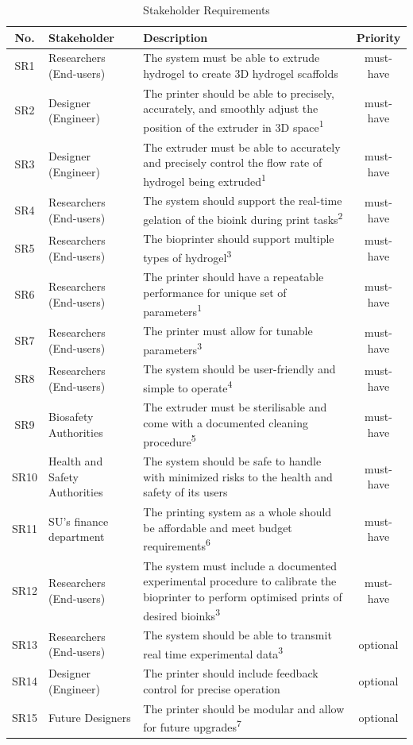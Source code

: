 \begin{longtable}{|c|m{2.2cm}|m{7.3cm}|c|}
\caption{Stakeholder Requirements}
\label{tab:stakeholder_requirements} \\
\hline
\textbf{No.} & \textbf{Stakeholder} & \textbf{Description} & \textbf{Priority} \\
\hline
\endhead
\hline
SR1 & Researchers (End-users) & The system must be able to extrude hydrogel to create 3D hydrogel scaffolds & must-have \\
\hline
SR2 & Designer (Engineer) & The printer should be able to precisely, accurately, and smoothly adjust the position of the extruder in 3D space\textsuperscript{1} & must-have \\
\hline
SR3 & Designer (Engineer) & The extruder must be able to accurately and precisely control the flow rate of hydrogel being extruded\textsuperscript{1} & must-have \\
\hline
SR4 & Researchers (End-users) & The system should support the real-time gelation of the bioink during print tasks\textsuperscript{2} & must-have \\
\hline
SR5 & Researchers (End-users) & The bioprinter should support multiple types of hydrogel\textsuperscript{3} & must-have \\
\hline
SR6 & Researchers (End-users) & The printer should have a repeatable performance for unique set of parameters\textsuperscript{1} & must-have \\
\hline
SR7 & Researchers (End-users) & The printer must allow for tunable parameters\textsuperscript{3} & must-have \\
\hline
SR8 & Researchers (End-users) & The system should be user-friendly and simple to operate\textsuperscript{4} & must-have \\
\hline
SR9 & Biosafety Authorities & The extruder must be sterilisable and come with a documented cleaning procedure\textsuperscript{5} & must-have \\
\hline
SR10 & Health and Safety Authorities & The system should be safe to handle with minimized risks to the health and safety of its users & must-have \\
\hline
SR11 & SU's finance department & The printing system as a whole should be affordable and meet budget requirements\textsuperscript{6} & must-have \\
\hline
SR12 & Researchers (End-users) & The system must include a documented experimental procedure to calibrate the bioprinter to perform optimised prints of desired bioinks\textsuperscript{3} & must-have \\
\hline
SR13 & Researchers (End-users) & The system should be able to transmit real time experimental data\textsuperscript{3} & optional \\
\hline
SR14 & Designer (Engineer) & The printer should include feedback control for precise operation & optional \\
\hline
SR15 & Future Designers & The printer should be modular and allow for future upgrades\textsuperscript{7} & optional \\
\hline
\end{longtable}
